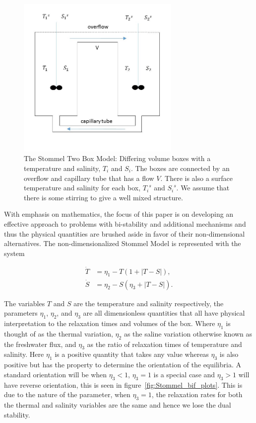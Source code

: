 \begin{figure}[H]
\centering
\includegraphics[width=0.7\textwidth]{intro/box.jpg}
\caption{The Stommel Two Box Model: Differing volume boxes with a temperature and salinity, $T_i$ and $S_i$. The boxes are connected by an overflow and capillary tube that has a flow $V$. There is also a surface temperature and salinity for each box, ${T_i}^s$ and ${S_i}^s$. We assume that there is some stirring to give a well mixed structure.}
\label{fig:stommel_boxes}
\end{figure}

With emphasis on mathematics, the focus of this paper is on developing an effective approach to problems with bi-stability and additional mechanisms and thus the physical quantities are brushed aside in favor of their non-dimensional alternatives. The non-dimensionalized Stommel Model is represented with the system

\begin{equation}
  \begin{aligned}
   \dot{T} & =  \eta_1-T(1+|T-S|), \\
   \dot{S}     & =  \eta_2-S(\eta_3+|T-S|). 
  \end{aligned}
\end{equation}

The variables $T$ and $S$ are the temperature and salinity respectively, the parameters $\eta_1$, $\eta_2$, and $\eta_3$ are all dimensionless quantities that all have physical interpretation to the relaxation times and volumes of the box. Where $\eta_1$ is thought of as the thermal variation, $\eta_2$ as the saline variation otherwise known as the freshwater flux, and $\eta_3$ as the ratio of relaxation times of temperature and salinity. Here $\eta_1$ is a positive quantity that takes any value whereas $\eta_3$ is also positive but has the property to determine the orientation of the equilibria. A standard orientation will be when $\eta_3<1$, $\eta_3=1$ is a special case and $\eta_3>1$ will have reverse orientation, this is seen in figure~\ref{fig:Stommel_bif_plots}. This is due to the nature of the parameter, when $\eta_3=1$, the relaxation rates for both the thermal and salinity variables are the same and hence we lose the dual stability.

